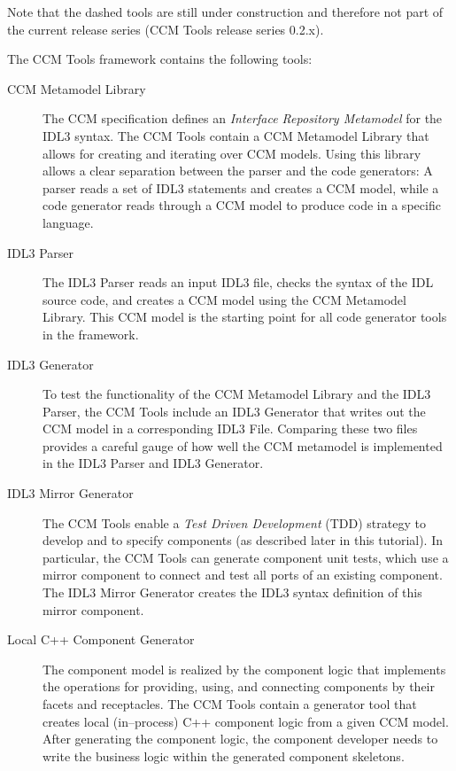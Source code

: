 Note that the dashed tools are still under construction and therefore not part
of the current release series (CCM Tools release series 0.2.x).

The CCM Tools framework contains the following tools:

\begin{description}
\item [CCM Metamodel Library]
The CCM specification defines an {\it Interface Repository Metamodel} for the
IDL3 syntax. The CCM Tools contain a CCM Metamodel Library that allows for
creating and iterating over CCM models. Using this library allows a clear
separation between the parser and the code generators: A parser reads a set of
IDL3 statements and creates a CCM model, while a code generator reads through a
CCM model to produce code in a specific language.

\item [IDL3 Parser]
The IDL3 Parser reads an input IDL3 file, checks the syntax of the IDL source
code, and creates a CCM model using the CCM Metamodel Library. This CCM model is
the starting point for all code generator tools in the framework.

\item [IDL3 Generator]
To test the functionality of the CCM Metamodel Library and the IDL3 Parser, the
CCM Tools include an IDL3 Generator that writes out the CCM model in a
corresponding IDL3 File. Comparing these two files provides a careful gauge of
how well the CCM metamodel is implemented in the IDL3 Parser and IDL3 Generator.

\item [IDL3 Mirror Generator]
The CCM Tools enable a {\it Test Driven Development} (TDD) strategy to develop
and to specify components (as described later in this tutorial). In particular,
the CCM Tools can generate component unit tests, which use a mirror component to
connect and test all ports of an existing component. The IDL3 Mirror Generator
creates the IDL3 syntax definition of this mirror component.

\item [Local C++ Component Generator]
The component model is realized by the component logic that implements the
operations for providing, using, and connecting components by their facets and
receptacles. The CCM Tools contain a generator tool that creates local
(in--process) C++ component logic from a given CCM model. After generating the
component logic, the component developer needs to write the business logic
within the generated component skeletons.


\end{description}

